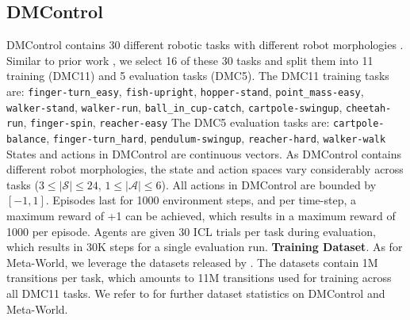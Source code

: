 \documentclass{article}
\begin{document}
\subsection{DMControl}\label{appendix:env-data-dmcontrol}
DMControl contains 30 different robotic tasks with different robot morphologies \citep{Tassa:18}.
Similar to prior work \citep{Hafner:19,Schmied:23}, we select 16 of these 30 tasks and split them into 11 training (DMC11) and 5 evaluation tasks (DMC5).
The DMC11 training tasks are:
\texttt{finger-turn\_easy}, \texttt{fish-upright}, \texttt{hopper-stand},
\texttt{point\_mass-easy},\texttt{ walker-stand}, \texttt{walker-run}, \texttt{ball\_in\_cup-catch},
\texttt{cartpole-swingup}, \texttt{cheetah-run}, \texttt{finger-spin}, \texttt{reacher-easy}
The DMC5 evaluation tasks are:
\texttt{cartpole-balance}, \texttt{finger-turn\_hard}, \texttt{pendulum-swingup}, \texttt{reacher-hard}, \texttt{walker-walk}
States and actions in DMControl are continuous vectors.
As DMControl contains different robot morphologies, the state and action spaces vary considerably across tasks ($3\leq|\mathcal{S}|\leq 24$, $1\leq|\mathcal{A}|\leq6$).
All actions in DMControl are bounded by $[-1,1]$.
Episodes last for 1000 environment steps, and per time-step, a maximum reward of +1 can be achieved, which results in a maximum reward of 1000 per episode.
Agents are given 30 ICL trials per task during evaluation, which results in 30K steps for a single evaluation run.
\textbf{Training Dataset}.
As for Meta-World, we leverage the datasets released by \citet{Schmied:23}.
The datasets contain 1M transitions per task, which amounts to 11M transitions used for training across all DMC11 tasks. We refer to \citet{Schmied:23} for further dataset statistics on DMControl and Meta-World.
\end{document}
